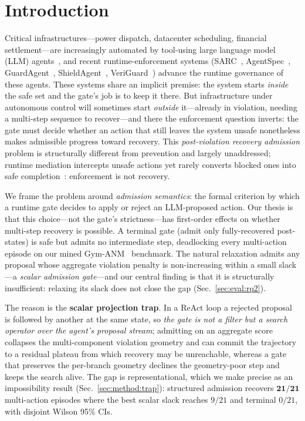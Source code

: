 \section{Introduction}
\label{sec:intro}

Critical infrastructures---power dispatch, datacenter scheduling, financial settlement---are increasingly automated by tool-using large language model (LLM) agents~\cite{gridagent2025}, and recent runtime-enforcement systems (SARC~\cite{sarc2026}, AgentSpec~\cite{agentspec2026}, GuardAgent~\cite{guardagent2025}, ShieldAgent~\cite{shieldagent2025}, VeriGuard~\cite{veriguard2025}) advance the runtime governance of these agents. These systems share an implicit premise: the system starts \emph{inside} the safe set and the gate's job is to keep it there. But infrastructure under autonomous control will sometimes start \emph{outside} it---already in violation, needing a multi-step sequence to recover---and there the enforcement question inverts: the gate must decide whether an action that still leaves the system unsafe nonetheless makes admissible progress toward recovery. This \emph{post-violation recovery admission} problem is structurally different from prevention and largely unaddressed; runtime mediation intercepts unsafe actions yet rarely converts blocked ones into safe completion~\cite{verifiertax2026}: enforcement is not recovery.

We frame the problem around \emph{admission semantics}: the formal criterion by which a runtime gate decides to apply or reject an LLM-proposed action. Our thesis is that this choice---not the gate's strictness---has first-order effects on whether multi-step recovery is possible. A terminal gate (admit only fully-recovered post-states) is safe but admits no intermediate step, deadlocking every multi-action episode on our mined Gym-ANM~\cite{henry2021gymanm} benchmark. The natural relaxation admits any proposal whose aggregate violation penalty is non-increasing within a small slack---a \emph{scalar admission gate}---and our central finding is that it is structurally insufficient: relaxing its slack does not close the gap (Sec.~\ref{sec:eval:rq2}).

The reason is the \textbf{scalar projection trap}. In a ReAct loop a rejected proposal is followed by another at the same state, so \emph{the gate is not a filter but a search operator over the agent's proposal stream}; admitting on an aggregate score collapses the multi-component violation geometry and can commit the trajectory to a residual plateau from which recovery may be unreachable, whereas a gate that preserves the per-branch geometry declines the geometry-poor step and keeps the search alive. The gap is representational, which we make precise as an impossibility result (Sec.~\ref{sec:method:trap}): structured admission recovers $\mathbf{21/21}$ multi-action episodes where the best scalar slack reaches $9/21$ and terminal $0/21$, with disjoint Wilson 95\% CIs.


